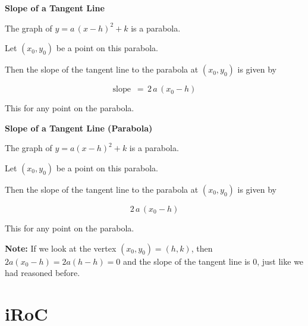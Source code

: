\documentclass{ximera}
\begin{document}
\begin{conclusion} \textbf{\textcolor{green!50!black}{Slope of a Tangent Line}} 


The graph of $y = a \, (x - h)^2 + k$ is a parabola.

Let $(x_0, y_0)$ be a point on this parabola.

Then the slope of the tangent line to the parabola at $(x_0, y_0)$ is given by 



\[ \text{slope } \, = \, 2 \, a \, (x_0 - h)  \]


\end{conclusion}
This for any point on the parabola.




































\begin{theorem} \textbf{\textcolor{green!50!black}{Slope of a Tangent Line (Parabola)}} 


The graph of $y = a (x - h)^2 + k$ is a parabola.

Let $(x_0, y_0)$ be a point on this parabola.

Then the slope of the tangent line to the parabola at $(x_0, y_0)$ is given by 



\[ 2 \, a \, (x_0 - h) \]


\end{theorem}
This for any point on the parabola.


\textbf{Note:} If we look at the vertex $(x_0, y_0) = (h, k)$, then $2 a (x_0 - h) = 2 a (h - h) = 0$ and the slope of the tangent line is $0$, just like we had reasoned before.





\section{iRoC}
\end{document}
